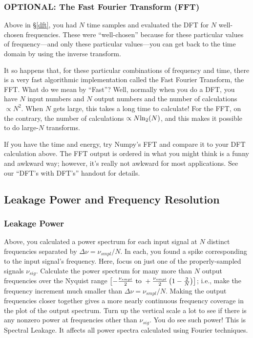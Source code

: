 \documentclass[11pt]{article}
\begin{document}
\subsubsection{OPTIONAL: The Fast Fourier Transform (FFT)} \label{fft}

Above in \S \ref{dft}, you had $N$ time samples and evaluated the DFT
for $N$ well-chosen frequencies. These were ``well-chosen'' because for
these particular values of frequency---and only these particular
values---you can get back to the time domain by using the inverse
transform.

It so happens that, for these particular combinations of frequency and
time, there is a very fast algorithmic implementation called the 
  Fast Fourier Transform, the FFT. What do we mean by ``Fast''? Well,
normally when you do a DFT, you have $N$ input numbers and $N$ output
numbers and the number of calculations $\propto N^2$. When $N$ gets large,
this takes a long time to calculate! For the FFT, on the contrary, the
number of calculations $\propto N {\rm ln}_2(N)$, and this makes it
possible to do large-$N$ transforms. 

If you have the time and energy, try Numpy's FFT and compare it to
your DFT calculation above. The FFT output is ordered in what you might
think is a funny and awkward way; however, it's really not awkward
for most applications. See our ``DFT's with DFT's'' handout for details.

\subsection{ Leakage Power and Frequency Resolution} \label{leakage}

\subsubsection{Leakage Power}

Above, you calculated a power spectrum for each input signal at $N$
distinct frequencies separated by $\Delta \nu = \nu_{smpl}/N$. In each,
you found a spike corresponding to the input signal's frequency. Here,
focus on just one of the properly-sampled signals $\nu_{sig}$. Calculate
the power spectrum for many more than $N$ output frequencies over the
Nyquist range $\left[-{\nu_{smpl} \over 2} \ {\rm to}\ +{\nu_{smpl}
\over 2} \left( 1 - {2 \over N} \right)\right]$; i.e., make the
frequency increment much smaller than $\Delta \nu = \nu_{smpl}/N$.
Making the output frequencies closer together gives a more nearly
continuous frequency coverage in the plot of the output spectrum.  Turn
up the vertical scale a lot to see if there is any nonzero power at
frequencies other than $\nu_{sig}$.  You do see such power! This
is Spectral Leakage. It affects all power spectra calculated using
Fourier techniques. 
\end{document}
